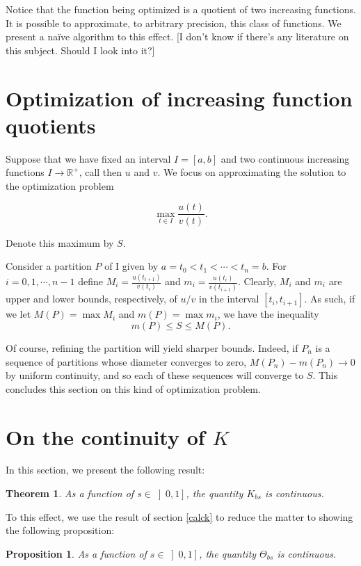 \documentclass[11pt, reqno]{amsart}
\newcommand{\R}{\mathbb{R}}
\newtheorem{theorem}{Theorem}
\newtheorem{prop}{Proposition}
\begin{document}
Notice that the function being optimized is a quotient of two increasing functions. It is possible to approximate, to arbitrary precision, this class of functions. We present a naïve algorithm to this effect. [I don't know if there's any literature on this subject. Should I look into it?]

\section{Optimization of increasing function quotients} \label{optimization}

Suppose that we have fixed an interval $I = \left[ a, b \right]$ and two continuous increasing functions $I \to \R^+$, call then $u$ and $v$. We focus on approximating the solution to the optimization problem

\[ \max_{t \in I} \frac{u(t)}{v(t)}.\]

Denote this maximum by $S$.

Consider a partition $P$ of I given by $a = t_0 < t_1 < \cdots < t_n = b$. For $i = 0, 1, \cdots, n-1$ define $M_i = \frac{u(t_{i+1})}{v(t_i)}$ and $m_i = \frac{u(t_i)}{v(t_{i+1})}$. Clearly, $M_i$ and $m_i$ are upper and lower bounds, respectively, of $u/v$ in the interval $\left[t_i, t_{i+1} \right]$. As such, if we let $M(P) = \max M_i$ and $m(P) = \max m_i$, we have the inequality
\[m(P) \leq S \leq M(P).\]

Of course, refining the partition will yield sharper bounds. Indeed, if $P_n$ is a sequence of partitions whose diameter converges to zero, $M(P_n) - m(P_n) \to 0$ by uniform continuity, and so each of these sequences will converge to $S$. This concludes this section on this kind of optimization problem.

\section{On the continuity of $K$}

In this section, we present the following result:

\begin{theorem}
As a function of $s \in \left]0, 1\right]$, the quantity $K_{bs}$ is continuous.
\end{theorem}

To this effect, we use the result of section \ref{calck} to reduce the matter to showing the following proposition:

\begin{prop}
As a function of $s \in \left]0, 1\right]$, the quantity $\Theta_{bs}$ is continuous.
\end{prop}
\end{document}

